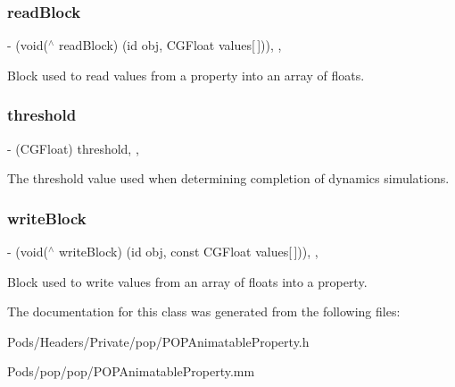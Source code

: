 \subsubsection{\texorpdfstring{read\+Block}{readBlock}}
{\footnotesize\ttfamily -\/ (void($^\wedge$ read\+Block) (id obj, C\+G\+Float values\mbox{[}$\,$\mbox{]}))\hspace{0.3cm}{\ttfamily [read]}, {\ttfamily [nonatomic]}, {\ttfamily [copy]}}

Block used to read values from a property into an array of floats. \mbox{\label{interface_p_o_p_animatable_property_a018afd207a81734b9ff792fe421d0a8d}} 
\subsubsection{\texorpdfstring{threshold}{threshold}}
{\footnotesize\ttfamily -\/ (C\+G\+Float) threshold\hspace{0.3cm}{\ttfamily [read]}, {\ttfamily [nonatomic]}, {\ttfamily [assign]}}

The threshold value used when determining completion of dynamics simulations. \mbox{\label{interface_p_o_p_animatable_property_a60e716c4e3d0b927ed742aab961d9898}} 
\subsubsection{\texorpdfstring{write\+Block}{writeBlock}}
{\footnotesize\ttfamily -\/ (void($^\wedge$ write\+Block) (id obj, const C\+G\+Float values\mbox{[}$\,$\mbox{]}))\hspace{0.3cm}{\ttfamily [read]}, {\ttfamily [nonatomic]}, {\ttfamily [copy]}}

Block used to write values from an array of floats into a property. 

The documentation for this class was generated from the following files\+:\begin{DoxyCompactItemize}
\item 
Pods/\+Headers/\+Private/pop/P\+O\+P\+Animatable\+Property.\+h\item 
Pods/pop/pop/P\+O\+P\+Animatable\+Property.\+mm\end{DoxyCompactItemize}
